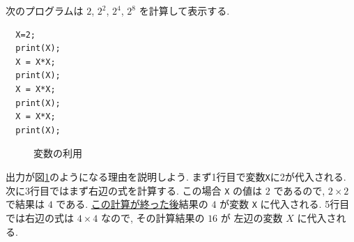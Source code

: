 \documentclass{jbook}
\begin{document}
次のプログラムは $2$, $2^2$, $2^4$, $2^8$ を計算して表示する.
\begin{screen}
\begin{verbatim}
  X=2;
  print(X);
  X = X*X;
  print(X);
  X = X*X;
  print(X);
  X = X*X;
  print(X);
\end{verbatim}
\end{screen}
\begin{figure}[thb]
\begin{center}
\end{center}
\caption{変数の利用} \label{fig:powerOf2b}
\end{figure}
出力が図\ref{fig:powerOf2b}のようになる理由を説明しよう.
まず1行目で変数{\tt X}に2が代入される.
次に3行目ではまず右辺の式を計算する. この場合 {\tt X} の値は $2$ であるので,
$2\times2$ で結果は $4$ である.
\underline{この計算が終った後}結果の $4$ が変数 {\tt X} に代入される.
5行目では右辺の式は $4 \times 4$ なので, その計算結果の $16$ が 左辺の変数 $X$
に代入される.
\end{document}
